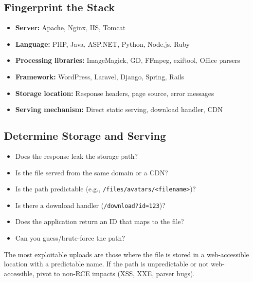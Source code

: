 \documentclass[11pt]{article}
\begin{document}
\subsection{Fingerprint the Stack}

\begin{itemize}
    \item \textbf{Server:} Apache, Nginx, IIS, Tomcat
    \item \textbf{Language:} PHP, Java, ASP.NET, Python, Node.js, Ruby
    \item \textbf{Processing libraries:} ImageMagick, GD, FFmpeg, exiftool, Office parsers
    \item \textbf{Framework:} WordPress, Laravel, Django, Spring, Rails
    \item \textbf{Storage location:} Response headers, page source, error messages
    \item \textbf{Serving mechanism:} Direct static serving, download handler, CDN
\end{itemize}

\subsection{Determine Storage and Serving}

\begin{checklistbox}
\begin{itemize}
    \item[\checkmark] Does the response leak the storage path?
    \item[\checkmark] Is the file served from the same domain or a CDN?
    \item[\checkmark] Is the path predictable (e.g., \texttt{/files/avatars/<filename>})?
    \item[\checkmark] Is there a download handler (\texttt{/download?id=123})?
    \item[\checkmark] Does the application return an ID that maps to the file?
    \item[\checkmark] Can you guess/brute-force the path?
\end{itemize}
\end{checklistbox}

\begin{note}
The most exploitable uploads are those where the file is stored in a web-accessible location with a predictable name. If the path is unpredictable or not web-accessible, pivot to non-RCE impacts (XSS, XXE, parser bugs).
\end{note}
\end{document}
